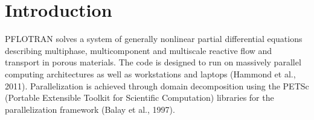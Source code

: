 \documentclass[12pt]{article}
\begin{document}
\vfill

\normalsize

\clearpage

\tableofcontents



\clearpage

\section{Introduction}

PFLOTRAN solves a system of generally nonlinear partial differential equations describing multiphase, multicomponent and multiscale reactive flow and transport in porous materials. The code is designed to run on massively parallel computing architectures as well as workstations and laptops (Hammond et al., 2011). Parallelization is achieved through domain decomposition using the PETSc (Port\-a\-ble Extensible Toolkit for Scientific Computation) libraries for the parallelization framework  (Balay et al., 1997).
\end{document}
